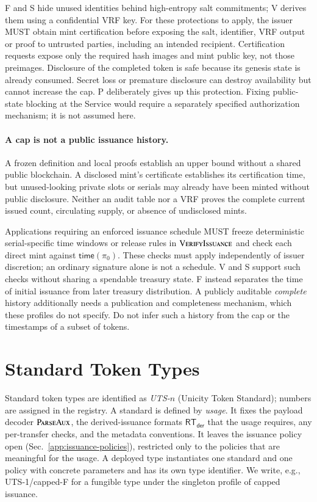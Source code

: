 F and S hide unused identities behind high-entropy salt commitments; V derives them using a confidential VRF key. For these protections to apply, the issuer MUST obtain mint certification before exposing the salt, identifier, VRF output or proof to untrusted parties, including an intended recipient. Certification requests expose only the required hash images and mint public key, not those preimages. Disclosure of the completed token is safe because its genesis state is already consumed. Secret loss or premature disclosure can destroy availability but cannot increase the cap. P deliberately gives up this protection. Fixing public-state blocking at the Service would require a separately specified authorization mechanism; it is not assumed here.

\paragraph{A cap is not a public issuance history.} A frozen definition and local proofs establish an upper bound without a shared public blockchain. A disclosed mint's certificate establishes its certification time, but unused-looking private slots or serials may already have been minted without public disclosure. Neither an audit table nor a VRF proves the complete current issued count, circulating supply, or absence of undisclosed mints.

Applications requiring an enforced issuance schedule MUST freeze deterministic serial-specific time windows or release rules in $\Call{VerifyIssuance}{}$ and check each direct mint against $\mathsf{time}(\pi_0)$. These checks must apply independently of issuer discretion; an ordinary signature alone is not a schedule. V and S support such checks without sharing a spendable treasury state. F instead separates the time of initial issuance from later treasury distribution. A publicly auditable \emph{complete} history additionally needs a publication and completeness mechanism, which these profiles do not specify. Do not infer such a history from the cap or the timestamps of a subset of tokens.

\section{Standard Token Types}\label{app:standard-types}

Standard token types are identified as \emph{UTS-$n$} (Unicity Token Standard); numbers are assigned in the registry. A standard is defined by \emph{usage}. It fixes the payload decoder $\Call{ParseAux}{}$, the derived-issuance formats $\mathsf{RT}_\mathsf{der}$ that the usage requires, any per-transfer checks, and the metadata conventions. It leaves the issuance policy open (Sec.~\ref{app:issuance-policies}), restricted only to the policies that are meaningful for the usage. A deployed type instantiates one standard and one policy with concrete parameters and has its own type identifier. We write, e.g., UTS-1/capped-F for a fungible type under the singleton profile of capped issuance.

